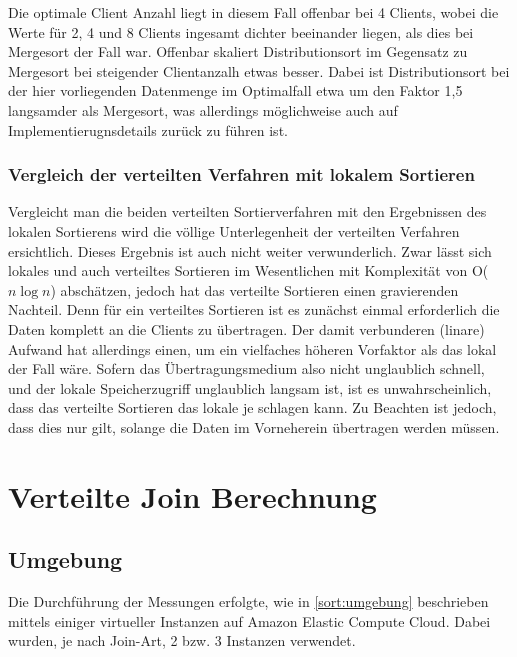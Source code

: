 \documentclass[fontsize=12pt,a4paper,headinclude=no,headings=small]{scrartcl}
\begin{document}
Die optimale Client Anzahl liegt in diesem Fall offenbar bei 4 Clients, wobei die Werte für 2, 4 und 8 Clients ingesamt dichter beeinander liegen, als dies bei Mergesort der Fall war. Offenbar skaliert Distributionsort im Gegensatz zu Mergesort bei steigender Clientanzalh etwas besser. Dabei ist Distributionsort bei der hier vorliegenden Datenmenge im Optimalfall etwa um den Faktor 1,5 langsamder als Mergesort, was allerdings möglichweise auch auf Implementierugnsdetails zurück zu führen ist.

\subsubsection{Vergleich der verteilten Verfahren mit lokalem Sortieren}
Vergleicht man die beiden verteilten Sortierverfahren mit den Ergebnissen des lokalen Sortierens wird die völlige Unterlegenheit der verteilten Verfahren ersichtlich. Dieses Ergebnis ist auch nicht weiter verwunderlich. Zwar lässt sich lokales und auch verteiltes Sortieren im Wesentlichen mit Komplexität von O($n \log n$) abschätzen, jedoch hat das verteilte Sortieren einen gravierenden Nachteil. Denn für ein verteiltes Sortieren ist es zunächst einmal erforderlich die Daten komplett an die Clients zu übertragen. Der damit verbunderen (linare) Aufwand hat allerdings einen, um ein vielfaches höheren Vorfaktor als das lokal der Fall wäre. Sofern das Übertragungsmedium also nicht unglaublich schnell, und der lokale Speicherzugriff unglaublich langsam ist, ist es unwahrscheinlich, dass das verteilte Sortieren das lokale je schlagen kann. Zu Beachten ist jedoch, dass dies nur gilt, solange die Daten im Vorneherein übertragen werden müssen.

\section{Verteilte Join Berechnung}
\subsection{Umgebung}
Die Durchführung der Messungen erfolgte, wie in \ref{sort:umgebung} beschrieben mittels einiger virtueller Instanzen auf Amazon Elastic Compute Cloud. Dabei wurden, je nach Join-Art, 2 bzw. 3 Instanzen verwendet.
\end{document}
